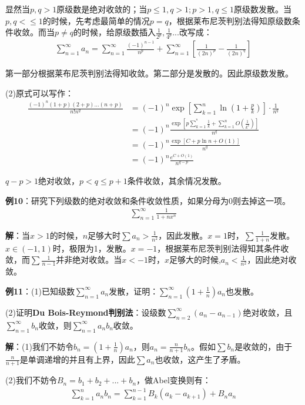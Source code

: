 \documentclass{ctexart}
\let\oldtextbf\textbf
\renewcommand{\textbf}[1]{\textcolor{brown!50!red}{\oldtextbf{#1}}}
\begin{document}
显然当$p,q>1$原级数是绝对收敛的；当$p\leq 1,q>1;p>1,q\leq 1$原级数发散。当$p,q<\leq 1$的时候，先考虑最简单的情况$p=q$，根据莱布尼茨判别法得知原级数条件收敛。而当$p\neq q$的时候，给原级数插入$\frac{1}{2^p},\frac{1}{4^p}...$改写成：
\begin{align*} 
 \sum_{n=1}^\infty a_n=\sum_{n=1}^\infty\frac{(-1)^{n-1}}{n^p}+\sum_{n=1}^\infty\left[
\frac{1}{(2n)^p}-\frac{1}{(2n)^q}  \right] 
\end{align*}

第一部分根据莱布尼茨判别法得知收敛。第二部分是发散的。因此原级数发散。

(2)原式可以写作：
\begin{align*} 
 \frac{(-1)^n(1+p)(2+p)...(n+p)}{n!n^q}&=(-1)^n\exp\left[\sum_{k=1}^n
\ln(1+\frac{p}{k})\right]  \cdot\frac{1}{n^q}\\
&=(-1)^n\frac{\exp\left[p\sum_{k=1}^{^n}\frac{1}{k}+\sum_{k=1}^nO(\frac{1}{k^2}) \right]}{n^q}\\
&=(-1)^n\frac{\exp[C+p\ln n+O(1)]}{n^q} \\
&=(-1)^n\frac{e^{C+O(1)}}{n^{q-p}} 
\end{align*}

$q-p>1$绝对收敛，$p<q\leq p+1$条件收敛，其余情况发散。

\textbf{\color{brown!50!red}例10}：研究下列级数的绝对收敛和条件收敛性质，如果分母为0则去掉这一项。
\begin{align*}
    \sum_{n=1}^\infty\frac{1}{1+nx^n}
\end{align*}

\textbf{\color{brown!50!red}解}：当$x>1$的时候，$n$足够大时$\sum a_n>\frac{1}{n^2}$，因此发散。$x=1$时，$\sum\frac{1}{1+n}$发散。$x\in(-1,1)$时，极限为1，发散。$x=-1$，根据莱布尼茨判别法得知其条件收敛，而$\sum\frac{1}{n-1}$并非绝对收敛。当$x<-1$时，$x$足够大的时候,$a_n<\frac{1}{n^2}$，因此绝对收敛。

\textbf{\color{brown!50!red}例11}：(1)已知级数$\sum_{n=1}^\infty a_n$发散，证明：$\sum_{n=1}^\infty (1+\frac{1}{n})a_n$也发散。

(2)证明\textbf{\color{brown!50!red}Du Bois-Reymond判别法}：设级数$\sum_{n=2}^\infty(a_n-a_{n-1})$绝对收敛，且$\sum_{n=1}^\infty b_n$收敛，则$\sum_{n=1}^\infty a_nb_n$收敛。

\textbf{\color{brown!50!red}解}：(1)我们不妨令$b_n=(1+\frac{1}{n})a_n$，则$a_n=\frac{n}{n+1}b_n$。假如$\sum b_n$是收敛的，由于$\frac{n}{n+1}$是单调递增的并且有上界，因此$\sum a_n$也收敛，这产生了矛盾。

(2)我们不妨令$B_n=b_1+b_2+...+b_n$，做Abel变换则有：
\begin{align*} 
 \sum_{k=1}^n a_nb_n=\sum_{k=1}^{n-1}B_k(a_k-a_{k+1})+B_na_n
\end{align*}
\end{document}
